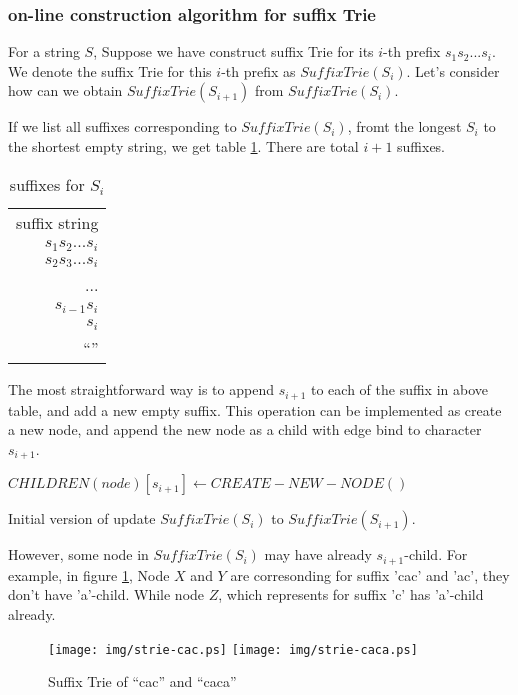 \documentclass{article}
\begin{document}
\subsubsection{on-line construction algorithm for suffix Trie}
For a string $S$, Suppose we have construct suffix Trie for its $i$-th prefix
$s_1s_2...s_i$. We denote the suffix Trie for this $i$-th prefix as $SuffixTrie(S_i)$.
Let's consider how can we obtain $SuffixTrie(S_{i+1})$ from $SuffixTrie(S_i)$.

If we list all suffixes corresponding to $SuffixTrie(S_i)$, fromt the longest 
$S_i$ to the shortest empty string, we get table \ref{tab:suffixes_s_i}. There
are total $i+1$ suffixes.

\begin{table}
  \begin{tabular}{r}
    suffix string \\
    $s_1s_2...s_i$ \\
    $s_2s_3...s_i$ \\
    ... \\
    $s_{i-1}s_i$ \\
    $s_i$ \\
    ``'' \\
  \end{tabular}
  \caption{suffixes for $S_i$}
  \label{tab:suffixes_s_i}
\end{table}

The most straightforward way is to append $s_{i+1}$ to each of the suffix in above
table, and add a new empty suffix. This operation can be implemented as create
a new node, and append the new node as a child with edge bind to character $s_{i+1}$.

\begin{algorithm}
\begin{algorithmic}
  \STATE $CHILDREN(node)[s_{i+1}] \leftarrow CREATE-NEW-NODE()$
\ENDFOR
\end{algorithmic}
\caption{Initial version of update $SuffixTrie(S_i)$ to $SuffixTrie(S_{i+1})$.}
\label{algo:strie1}
\end{algorithm}

However, some node in $SuffixTrie(S_i)$ may have already $s_{i+1}$-child. 
For example, in figure \ref{fig:strie-cac}, Node $X$ and $Y$ are corresonding 
for suffix 'cac' and 'ac', they don't have 'a'-child.
While node $Z$, which represents for suffix 'c' has 'a'-child already.

\begin{figure}[htbp]
   \begin{center}
     \texttt{[image: img/strie-cac.ps]}
     \texttt{[image: img/strie-caca.ps]}
     \caption{Suffix Trie of ``cac'' and ``caca''}
     \label{fig:strie-cac}
   \end{center}
\end{figure}
\end{document}
